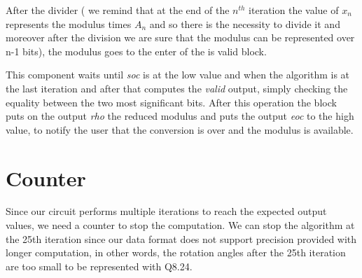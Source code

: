 \documentclass[12pt,a4paper]{report}
\begin{document}
After the divider ( we remind that at the end of the $n^{th}$ iteration the value of $x_{n}$ represents the modulus times $A_{n}$ and so there is the necessity to divide it and moreover after the division we are sure that the modulus can be represented over n-1 bits), the modulus goes to the enter of the is \textunderscore valid block. 

This component waits until \emph{soc} is at the low value and when the algorithm is at the last iteration and after that computes the \emph{valid} output, simply checking the equality between the two most significant bits. After this operation the block puts on the output \emph{rho} the reduced modulus and puts the output \emph{eoc} to the high value, to notify the user that the conversion is over and the modulus is available.

\section{Counter}
Since our circuit performs multiple iterations to reach the expected output values, we need a counter to stop the computation.
We can stop the algorithm at the 25th iteration since our data format does not support precision provided with longer computation, in other words, the rotation angles after the 25th iteration are too small to be represented with Q8.24.
\end{document}

